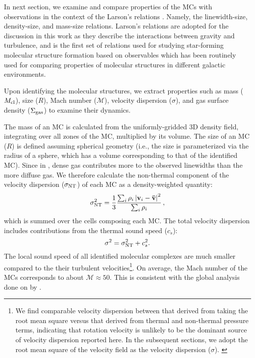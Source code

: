 \IfFileExists{emulateapjlegacy.cls}{\documentclass[iop]{emulateapjlegacy}}{\documentclass[iop]{emulateapj}}
\newcommand{\AP}[1]{({\bf \color{apcolor} AP: #1})}
\begin{document}
In next section, we examine and compare properties of the MCs with
observations in the context of the Larson's relations \citep{Larson81a}. 
Namely, the linewidth-size, density-size, and mass-size relations.
Larson's relations are adopted for the discussion in this work as they 
describe the interactions between gravity and turbulence, and is the first set of
relations used for studying star-forming molecular structure formation based on observables
which has been routinely used for comparing properties of molecular structures in different galactic environments.

Upon identifying the molecular structures, we extract properties such as
mass ($M_{\rm cl}$),
size ($R$),
Mach number ($\mathcal{M}$), velocity dispersion ($\sigma$), and
gas surface density ($\Sigma_{\rm gas}$)
to examine their dynamics.

The mass of an MC is calculated from the uniformly-gridded 3D density field,
integrating over all zones of the MC, multiplied by its volume.
The size of an MC ($R$) is defined assuming spherical geometry (i.e.,
the size is parameterized via the radius of a sphere, which has a volume corresponding to that of the identified MC).
Since in \obs, dense gas contributes more to the observed linewidths than the more diffuse gas. We therefore calculate
the non-thermal component of the velocity dispersion ($\sigma_{\rm NT}$) of each MC as a density-weighted quantity:
\begin{equation}
\sigma_{\rm NT}^2 = \frac{1}{{3}}\frac{\sum_{i} \rho_i \left|\mathbf{v}_i - \mathbf{\bar v}\right|^2}{\sum_i \rho_i}\,,
\end{equation}
which is summed over the cells composing each MC.
The total velocity dispersion includes contributions from the thermal sound speed ($c_s$):
\begin{equation}
\sigma^2 = \sigma_{\rm NT}^2 + c_s^2.
\end{equation}
The local sound speed of all identified molecular complexes are much smaller compared to the their
turbulent velocities\footnote{We find comparable velocity dispersion between that derived from
taking the root mean square versus that derived from thermal and non-thermal pressure terms, indicating that
rotation velocity is unlikely to be the dominant source of velocity dispersion reported here.
In the subsequent sections, we adopt the root mean square of the velocity field
as the velocity dispersion ($\sigma$). \label{ftn:veldisp}}.
On average, the Mach number of the MCs corresponds to about $\mathcal{M}\approx50$.
This is consistent with the global analysis done on \flower by \citet{Vallini18a}.
\end{document}
